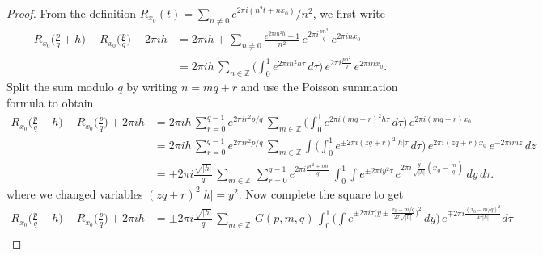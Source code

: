 \documentclass[11pt,reqno]{amsart}
\theoremstyle{definition}
\begin{document}
\begin{proof}
From the definition $R_{x_0}(t) = \sum_{n \neq 0}e^{2\pi i ( n^2 t + n x_0 ) }  /n^2$, we first write
\begin{equation}
\begin{split}
R_{x_0}\Big( \frac{p}{q} + h \Big) - R_{x_0}\Big( \frac{p}{q} \Big) + 2\pi i h
& = 2 \pi i h +   \sum_{n \neq 0} \frac{e^{2\pi i n^2 h} - 1}{n^2}\, e^{2\pi i \frac{pn^2}{q}} \, e^{2\pi i n x_0} \\
& = 2\pi i h \, \sum_{n \in \mathbb Z} \Big( \int_0^1 e^{2\pi i n^2 h \tau} \, d\tau \Big) \, e^{2\pi i \frac{pn^2}{q}} \, e^{2\pi i n x_0}.
\end{split}
\end{equation}
Split the sum modulo $q$ by writing $n = mq+r$ and use the Poisson summation formula to obtain
\begin{equation}
\begin{split}
R_{x_0}\Big( \frac{p}{q} + h \Big) - R_{x_0}\Big( \frac{p}{q} \Big) + 2\pi i h 
& = 2\pi i h \, \sum_{r = 0}^{q-1} e^{2\pi i r^2 p/q} \,  \sum_{m \in \mathbb Z} \Big( \int_0^1 e^{2\pi i (mq+r)^2 h \tau} \, d\tau \Big) \,  e^{2\pi i (mq+r) x_0} \\
& = 2\pi i h \, \sum_{r = 0}^{q-1} e^{2\pi i r^2 p/q} \,  \sum_{m \in \mathbb Z} \int \Big( \int_0^1 e^{\pm 2\pi i (zq+r)^2 |h| \tau} \, d\tau \Big) \,  e^{2\pi i (zq+r) x_0} \, e^{-2\pi i m z} \, dz \\
& = \pm 2\pi i \frac{\sqrt{|h|}}{q} \,\sum_{m \in \mathbb Z} \,  \sum_{r = 0}^{q-1} e^{2\pi i \frac{p r^2 + m r }{q}} \,   \int_0^1 \int  e^{\pm 2\pi i y^2 \tau}  \,  e^{2\pi i \frac{ y}{\sqrt{|h|}} ( x_0 - \frac{m}{q})} \, dy \, d\tau.
\end{split}
\end{equation}
where we changed variables $(zq+r)^2 |h| = y^2$. Now complete the square to get
\begin{equation}\label{eq:After_Heuristic_Computations}
\begin{split}
R_{x_0}\Big( \frac{p}{q} + h \Big) - R_{x_0}\Big( \frac{p}{q} \Big) + 2\pi i h 
& = \pm 2\pi i \frac{\sqrt{|h|}}{q} \,\sum_{m \in \mathbb Z} \, G(p,m,q) \,   \int_0^1 \Big( \int  e^{\pm 2\pi i \tau \Big( y \pm \frac{x_0 - m/q}{2 \tau\sqrt{|h|}} \Big)^2}   \,   dy \Big) \, e^{\mp 2\pi i \frac{(x_0 - m/q)^2}{4\tau |h|} } d\tau  \\

\end{split}
\end{equation}
\end{proof}
\end{document}
